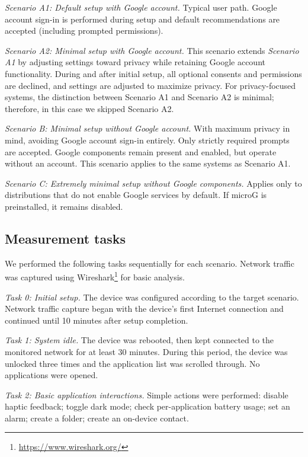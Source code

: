 \textit{Scenario A1: Default setup with Google account.}
Typical user path. Google account sign-in is performed during setup and default recommendations are accepted (including prompted permissions).

\textit{Scenario A2: Minimal setup with Google account.}
This scenario extends \textit{Scenario A1} by adjusting settings toward privacy while retaining Google account functionality. During and after initial setup, all optional consents and permissions are declined, and settings are adjusted to maximize privacy. For privacy-focused systems, the distinction between Scenario A1 and Scenario A2 is minimal; therefore, in this case we skipped Scenario A2.

\textit{Scenario B: Minimal setup without Google account.}
With maximum privacy in mind, avoiding Google account sign-in entirely. Only strictly required prompts are accepted. Google components remain present and enabled, but operate without an account. This scenario applies to the same systems as Scenario A1.

\textit{Scenario C: Extremely minimal setup without Google components.}
Applies only to distributions that do not enable Google services by default. If microG is preinstalled, it remains disabled.

\subsection{Measurement tasks}
We performed the following tasks sequentially for each scenario. Network traffic was captured using Wireshark\footnote{\url{https://www.wireshark.org/}} for basic analysis.

\textit{Task 0: Initial setup.}
The device was configured according to the target scenario. Network traffic capture began with the device's first Internet connection and continued until 10 minutes after setup completion.

\textit{Task 1: System idle.}
The device was rebooted, then kept connected to the monitored network for at least 30 minutes. During this period, the device was unlocked three times and the application list was scrolled through. No applications were opened.

\textit{Task 2: Basic application interactions.}
Simple actions were performed: disable haptic feedback; toggle dark mode; check per-application battery usage; set an alarm; create a folder; create an on-device contact.
